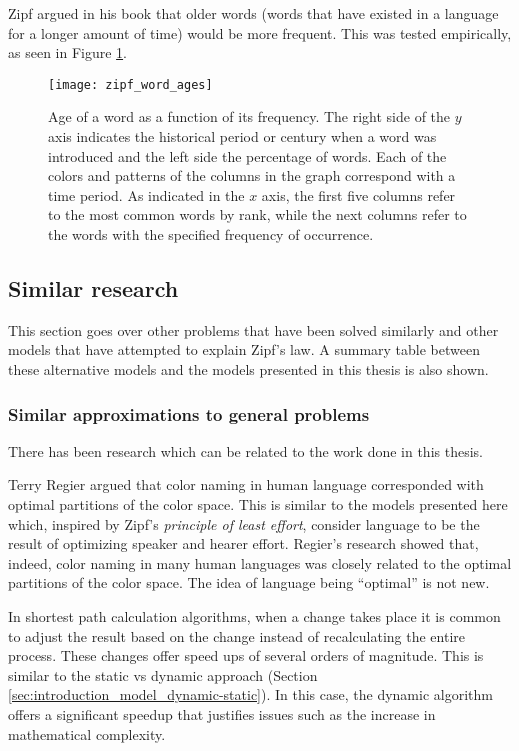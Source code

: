 Zipf argued in his book \cite{Zipf1949a} that older words (words that have existed in a language for a longer amount of time) would be more frequent.
This was tested empirically, as seen in Figure \ref{fig:zipf_word_ages}.

\begin{figure}
  \centering
  \texttt{[image: zipf\_word\_ages]}
  \caption{
    Age of a word as a function of its frequency.
    The right side of the $y$ axis indicates the historical period or century when a word was introduced and the left side the percentage of words.
    Each of the colors and patterns of the columns in the graph correspond with a time period.
    As indicated in the $x$ axis, the first five columns refer to the most common words by rank, while the next columns refer to the words with the specified frequency of occurrence.
  }
  \label{fig:zipf_word_ages}
\end{figure}

\subsection{Similar research}
\label{sec:introduction_background_similar}

This section goes over other problems that have been solved similarly and other models that have attempted to explain Zipf's law.
A summary table between these alternative models and the models presented in this thesis is also shown.

\subsubsection{Similar approximations to general problems}

There has been research which can be related to the work done in this thesis.

Terry Regier argued \cite{Regier2007a} that color naming in human language corresponded with optimal partitions of the color space.
This is similar to the models presented here which, inspired by Zipf's \emph{principle of least effort}, consider language to be the result of optimizing speaker and hearer effort.
Regier's research showed that, indeed, color naming in many human languages was closely related to the optimal partitions of the color space.
The idea of language being ``optimal'' is not new.

In shortest path calculation algorithms, when a change takes place it is common to adjust the result based on the change instead of recalculating the entire process.
These changes offer speed ups of several orders of magnitude. \cite{Buriol2003a}
This is similar to the static vs dynamic approach (Section \ref{sec:introduction_model_dynamic-static}).
In this case, the dynamic algorithm offers a significant speedup that justifies issues such as the increase in mathematical complexity.

